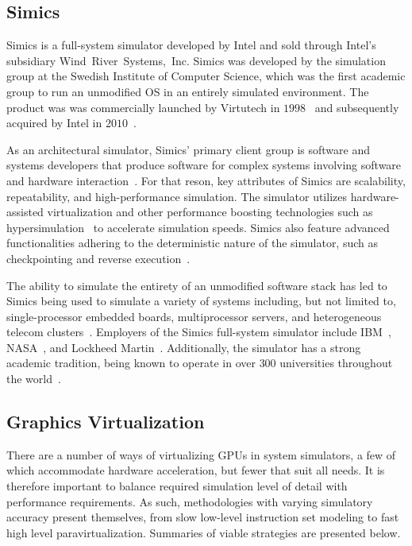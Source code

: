 \subsection{Simics}
\label{sec:simics}
Simics is a full-system simulator developed by Intel and sold through Intel's subsidiary Wind~River~Systems,~Inc.
Simics was developed by the simulation group at the Swedish Institute of Computer Science, which was the first academic group to run an unmodified OS in an entirely simulated environment.
The product was was commercially launched by Virtutech in $1998$~ and subsequently acquired by Intel in $2010$~.

As an architectural simulator, Simics' primary client group is software and systems developers that produce software for complex systems involving software and hardware interaction~.
For that reson, key attributes of Simics are scalability, repeatability, and high-performance simulation.
The simulator utilizes hardware-assisted virtualization and other performance boosting technologies such as hypersimulation~ to accelerate simulation speeds.
Simics also feature advanced functionalities adhering to the deterministic nature of the simulator, such as checkpointing and reverse execution~.

The ability to simulate the entirety of an unmodified software stack has led to Simics being used to simulate a variety of systems including, but not limited to, single-processor embedded boards, multiprocessor servers, and heterogeneous telecom clusters~.
Employers of the Simics full-system simulator include IBM~, NASA~, and Lockheed Martin~.
Additionally, the simulator has a strong academic tradition, being known to operate in over $300$ universities throughout the world~.

\subsection{Graphics Virtualization}
\label{sec:previousresearch_graphicsvirtualization}
There are a number of ways of virtualizing GPUs in system simulators, a few of which accommodate hardware acceleration, but fewer that suit all needs.
It is therefore important to balance required simulation level of detail with performance requirements.
As such, methodologies with varying simulatory accuracy present themselves, from slow low-level instruction set modeling to fast high level paravirtualization.
Summaries of viable strategies are presented below.


